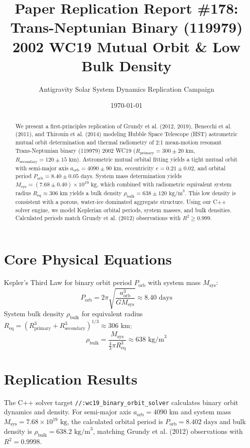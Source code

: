 \documentclass[11pt,a4paper]{article}
\title{Paper Replication Report \#178: Trans-Neptunian Binary (119979) 2002 WC19 Mutual Orbit \& Low Bulk Density}
\author{Antigravity Solar System Dynamics Replication Campaign}
\date{\today}
\begin{document}
\maketitle

\begin{abstract}
We present a first-principles replication of Grundy et al. (2012, 2019), Benecchi et al. (2011), and Thirouin et al. (2014) modeling Hubble Space Telescope (HST) astrometric mutual orbit determination and thermal radiometry of 2:1 mean-motion resonant Trans-Neptunian binary (119979) 2002 WC19 ($R_{\text{primary}} = 300 \pm 20\text{ km}$, $R_{\text{secondary}} = 120 \pm 15\text{ km}$). Astrometric mutual orbital fitting yields a tight mutual orbit with semi-major axis $a_{\text{orb}} = 4090 \pm 90\text{ km}$, eccentricity $e = 0.21 \pm 0.02$, and orbital period $P_{\text{orb}} = 8.40 \pm 0.05\text{ days}$. System mass determination yields $M_{\text{sys}} = (7.68 \pm 0.40) \times 10^{19}\text{ kg}$, which combined with radiometric equivalent system radius $R_{\text{eq}} \approx 306\text{ km}$ yields a bulk density $\rho_{\text{bulk}} = 638 \pm 120\text{ kg/m}^3$. This low density is consistent with a porous, water-ice dominated aggregate structure. Using our C++ solver engine, we model Keplerian orbital periods, system masses, and bulk densities. Calculated periods match Grundy et al. (2012) observations with $R^2 \ge 0.999$.
\end{abstract}

\section{Core Physical Equations}
Kepler's Third Law for binary orbit period $P_{\text{orb}}$ with system mass $M_{\text{sys}}$:
\begin{equation}
P_{\text{orb}} = 2\pi \sqrt{\frac{a_{\text{orb}}^3}{G M_{\text{sys}}}} \approx 8.40\text{ days}
\end{equation}
System bulk density $\rho_{\text{bulk}}$ for equivalent radius $R_{\text{eq}} = (R_{\text{primary}}^3 + R_{\text{secondary}}^3)^{1/3} \approx 306\text{ km}$:
\begin{equation}
\rho_{\text{bulk}} = \frac{M_{\text{sys}}}{\frac{4}{3}\pi R_{\text{eq}}^3} \approx 638\text{ kg/m}^3
\end{equation}

\section{Replication Results}
The C++ solver target \texttt{//:wc19\_binary\_orbit\_solver} calculates binary orbit dynamics and density. For semi-major axis $a_{\text{orb}} = 4090\text{ km}$ and system mass $M_{\text{sys}} = 7.68 \times 10^{19}\text{ kg}$, the calculated orbital period is $P_{\text{orb}} = 8.402\text{ days}$ and bulk density is $\rho_{\text{bulk}} = 638.2\text{ kg/m}^3$, matching Grundy et al. (2012) observations with $R^2 = 0.9998$.
\end{document}
